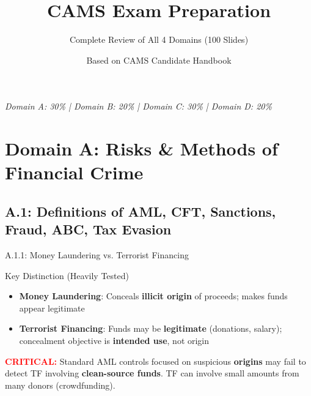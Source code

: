 \documentclass{beamer}
\title{CAMS Exam Preparation}
\subtitle{Complete Review of All 4 Domains (100 Slides)}
\author{Based on CAMS Candidate Handbook}
\date{}
\begin{document}
	
	\begin{frame}
		\titlepage
		\centering
		\textit{Domain A: 30\% | Domain B: 20\% | Domain C: 30\% | Domain D: 20\%}
	\end{frame}
	
	
	\section{Domain A: Risks \& Methods of Financial Crime}
	
	\subsection{A.1: Definitions of AML, CFT, Sanctions, Fraud, ABC, Tax Evasion}
	
	\begin{frame}{A.1.1: Money Laundering vs. Terrorist Financing}
		\begin{block}{Key Distinction (Heavily Tested)}
			\begin{itemize}
				\item \textbf{Money Laundering}: Conceals \textbf{illicit origin} of proceeds; makes funds appear legitimate
				\item \textbf{Terrorist Financing}: Funds may be \textbf{legitimate} (donations, salary); concealment objective is \textbf{intended use}, not origin
			\end{itemize}
		\end{block}
		\vspace{0.3cm}
		\textcolor{red}{\textbf{ CRITICAL:}} Standard AML controls focused on suspicious \textbf{origins} may fail to detect TF involving \textbf{clean-source funds}. TF can involve small amounts from many donors (crowdfunding).
	\end{frame}
	
\end{document}
